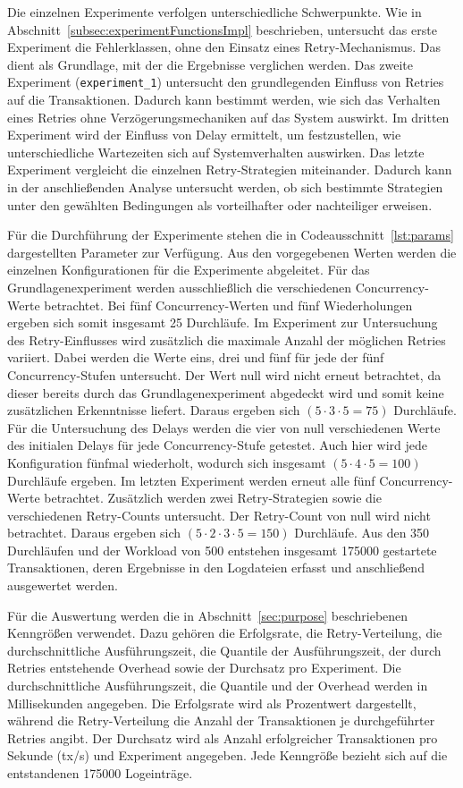 
Die einzelnen Experimente verfolgen unterschiedliche Schwerpunkte.
Wie in Abschnitt~\ref{subsec:experimentFunctionsImpl} beschrieben, untersucht das erste Experiment die Fehlerklassen,
ohne den Einsatz eines Retry-Mechanismus.
Das dient als Grundlage, mit der die Ergebnisse verglichen werden.
Das zweite Experiment (\texttt{experiment\_1}) untersucht den grundlegenden Einfluss von Retries auf die Transaktionen.
Dadurch kann bestimmt werden, wie sich das Verhalten eines Retries ohne Verzögerungsmechaniken auf das System auswirkt.
Im dritten Experiment wird der Einfluss von Delay ermittelt, um festzustellen, wie unterschiedliche Wartezeiten sich
auf Systemverhalten auswirken.
Das letzte Experiment vergleicht die einzelnen Retry-Strategien miteinander.
Dadurch kann in der anschließenden Analyse untersucht werden, ob sich bestimmte Strategien unter den gewählten
Bedingungen als vorteilhafter oder nachteiliger erweisen.

Für die Durchführung der Experimente stehen die in Codeausschnitt~\ref{lst:params} dargestellten Parameter zur
Verfügung.
Aus den vorgegebenen Werten werden die einzelnen Konfigurationen für die Experimente abgeleitet.
Für das Grundlagenexperiment werden ausschließlich die verschiedenen Concurrency-Werte betrachtet.
Bei fünf Concurrency-Werten und fünf Wiederholungen ergeben sich somit insgesamt 25 Durchläufe.
Im Experiment zur Untersuchung des Retry-Einflusses wird zusätzlich die maximale Anzahl der möglichen Retries variiert.
Dabei werden die Werte eins, drei und fünf für jede der fünf Concurrency-Stufen untersucht.
Der Wert null wird nicht erneut betrachtet, da dieser bereits durch das Grundlagenexperiment abgedeckt wird und somit
keine zusätzlichen Erkenntnisse liefert.
Daraus ergeben sich $(5 \cdot 3 \cdot 5 = 75)$ Durchläufe.
Für die Untersuchung des Delays werden die vier von null verschiedenen Werte des initialen Delays für jede
Concurrency-Stufe getestet.
Auch hier wird jede Konfiguration fünfmal wiederholt, wodurch sich insgesamt $(5 \cdot 4 \cdot 5 = 100)$
Durchläufe ergeben.
Im letzten Experiment werden erneut alle fünf Concurrency-Werte betrachtet.
Zusätzlich werden zwei Retry-Strategien sowie die verschiedenen Retry-Counts untersucht.
Der Retry-Count von null wird nicht betrachtet.
Daraus ergeben sich $(5 \cdot 2 \cdot 3 \cdot 5 = 150)$ Durchläufe.
Aus den 350 Durchläufen und der Workload von 500 entstehen insgesamt 175000 gestartete
Transaktionen, deren Ergebnisse in den Logdateien erfasst und anschließend ausgewertet werden.

Für die Auswertung werden die in Abschnitt~\ref{sec:purpose} beschriebenen Kenngrößen verwendet.
Dazu gehören die Erfolgsrate, die Retry-Verteilung, die durchschnittliche Ausführungszeit, die Quantile der
Ausführungszeit, der durch Retries entstehende Overhead sowie der Durchsatz pro Experiment.
Die durchschnittliche Ausführungszeit, die Quantile und der Overhead werden in Millisekunden angegeben.
Die Erfolgsrate wird als Prozentwert dargestellt, während die Retry-Verteilung die Anzahl der Transaktionen je
durchgeführter Retries angibt.
Der Durchsatz wird als Anzahl erfolgreicher Transaktionen pro Sekunde (tx/s) und Experiment angegeben.
Jede Kenngröße bezieht sich auf die entstandenen 175000 Logeinträge.